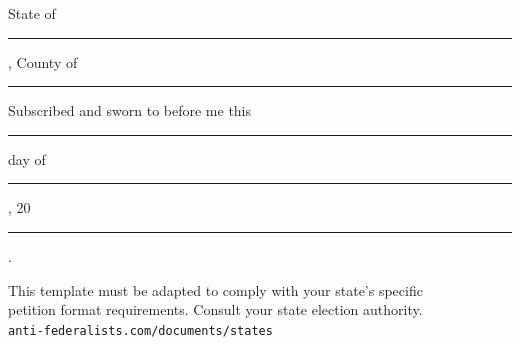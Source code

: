 \documentclass[11pt, letterpaper]{article}
\begin{document}

\noindent State of \rule{4cm}{0.4pt}, County of \rule{4cm}{0.4pt}

\vspace{0.5em}
\noindent Subscribed and sworn to before me this \rule{2cm}{0.4pt} day of \rule{3cm}{0.4pt}, 20\rule{1cm}{0.4pt}.




\newpage


\vspace{1.5cm}

\begin{center}
  {\small\color{afp-gray}\sffamily
    This template must be adapted to comply with your state's specific\\
    petition format requirements. Consult your state election authority.\\[0.5em]
    \texttt{anti-federalists.com/documents/states}
  }
\end{center}
\end{document}

